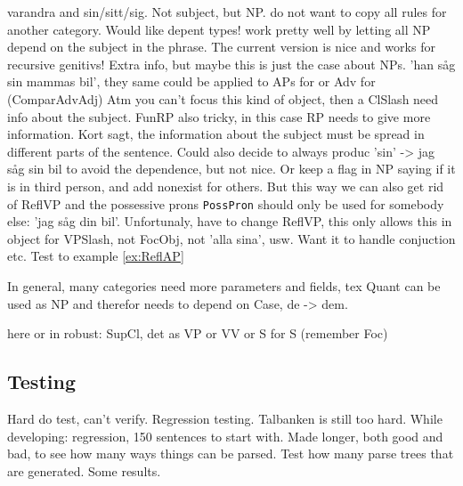 \documentclass{report}
\begin{document}
varandra and sin/sitt/sig. Not subject, but NP.
do not want to copy all rules for another category. Would like depent types!
work pretty well by letting all NP depend on the subject in the phrase.
The current version is nice and works for recursive genitivs!
Extra info, but maybe this is just the case about NPs.
'han såg sin mammas bil', they same could be applied to
APs for
\label{ex:ReflAP}
 or Adv for
 (ComparAdvAdj)
Atm you can't focus this kind of object, then a ClSlash need info about the
subject. FunRP also tricky, in this case RP needs to give more information.
Kort sagt, the information about the subject must be spread
in different parts of the sentence. 
Could also decide to always produc 'sin' -> jag såg sin bil
to avoid the dependence, but not nice. Or keep a flag in NP saying if it is
in third person, and add nonexist for others. But this way we can also get rid
of ReflVP and the possessive prons \verb|PossPron| should only be used for somebody else:
'jag såg din bil'.
Unfortunaly, have to change ReflVP, this only allows this in object for VPSlash, not FocObj,
not 'alla sina', usw. Want it to handle conjuction 
etc.
Test to example \ref{ex:ReflAP}

In general, many categories need more parameters and fields, tex Quant can be used as NP
and therefor needs to depend on Case, de -> dem.

here or in robust: SupCl, det as VP or VV or S for S (remember Foc)

\subsection{Testing}
Hard do test, can't verify. Regression testing. Talbanken is still too hard.
While developing: regression, 150 sentences to start with. Made longer, both good and bad,
to see how many ways things can be parsed.
Test how many parse trees that are generated.
Some results.

\end{document}
